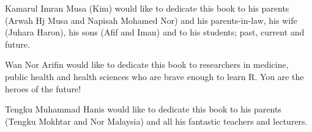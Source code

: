 
\thispagestyle{empty}

\begin{center}

Kamarul Imran Musa (Kim) would like to dedicate this book to his parents (Arwah Hj Musa and Napisah Mohamed Nor) and his parents-in-law, his wife (Juhara Haron), his sons (Afif and Iman) and to his students; past, current and future.

Wan Nor Arifin would like to dedicate this book to researchers in medicine, public health and health sciences who are brave enough to learn R. You are the heroes of the future!

Tengku Muhammad Hanis would like to dedicate this book to his parents (Tengku Mokhtar and Nor Malaysia) and all his fantastic teachers and lecturers.

\end{center}

\setlength{\abovedisplayskip}{-5pt}
\setlength{\abovedisplayshortskip}{-5pt}

